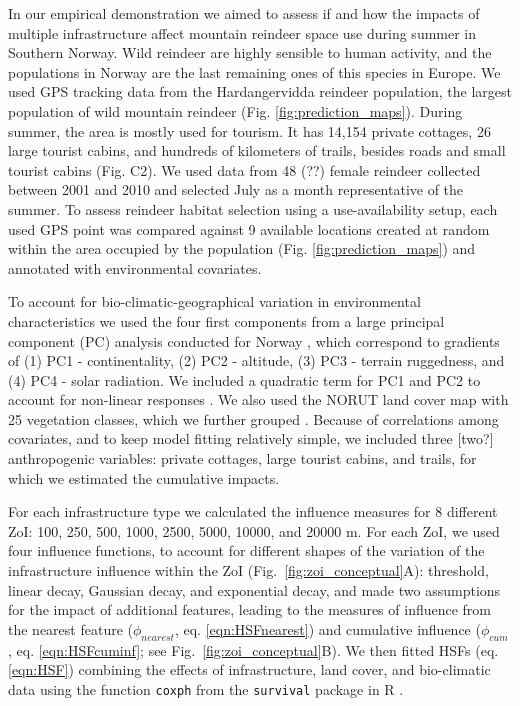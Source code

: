 \documentclass[titlepage]{article}
\begin{document}
In our empirical demonstration we aimed to assess if and how the impacts of multiple infrastructure affect mountain reindeer space use during summer in Southern Norway. Wild reindeer are highly sensible to human activity, and the populations in Norway are the last remaining ones of this species in Europe. We used GPS tracking data from the Hardangervidda reindeer population, the largest population of wild mountain reindeer (Fig. \ref{fig:prediction_maps}). During summer, the area is mostly used for tourism. It has 14,154 private cottages, 26 large tourist cabins, and hundreds of kilometers of trails, besides roads and small tourist cabins (Fig. C2). We used data from 48 (??) female reindeer collected between 2001 and 2010 \citep[see][for further details]{panzacchi_searching_2015} and selected July as a month representative of the summer. To assess reindeer habitat selection using a use-availability setup, each used GPS point was compared against 9 available locations created at random within the area occupied by the population (Fig. \ref{fig:prediction_maps}) and annotated with environmental covariates.

To account for bio-climatic-geographical variation in environmental characteristics we used the four first components from a large principal component (PC) analysis conducted for Norway \citep{bakkestuen_step-less_2008}, which correspond to gradients of (1) PC1 - continentality, (2) PC2 - altitude, (3) PC3 - terrain ruggedness, and (4) PC4 - solar radiation. We included a quadratic term for PC1 and PC2 to account for non-linear responses \citep{panzacchi_searching_2015}. We also used the NORUT land cover map with 25 vegetation classes, which we further grouped \citep[see Table C2][]{johansen_vegetasjonskart_2009}. Because of correlations among covariates, and to keep model fitting relatively simple, we included three [two?] anthropogenic variables: private cottages, large tourist cabins, and trails, for which we estimated the cumulative impacts.

For each infrastructure type we calculated the influence measures for 8 different ZoI: 100, 250, 500, 1000, 2500, 5000, 10000, and 20000 m. For each ZoI, we used four influence functions, to account for different shapes of the variation of the infrastructure influence within the ZoI (Fig.~\ref{fig:zoi_conceptual}A): threshold, linear decay, Gaussian decay, and exponential decay, and made two assumptions for the impact of additional features, leading to the measures of influence from the nearest feature ($\phi_{nearest}$, eq. \ref{eqn:HSFnearest}) and cumulative influence ($\phi_{cum}$, eq. \ref{eqn:HSFcuminf}; see Fig.~\ref{fig:zoi_conceptual}B). We then fitted HSFs (eq. \ref{eqn:HSF}) combining the effects of infrastructure, land cover, and bio-climatic data using the function \verb|coxph| from the \verb|survival| package in R \citep{therneau_package_2020, therneau_modeling_2000}. 
\end{document}
